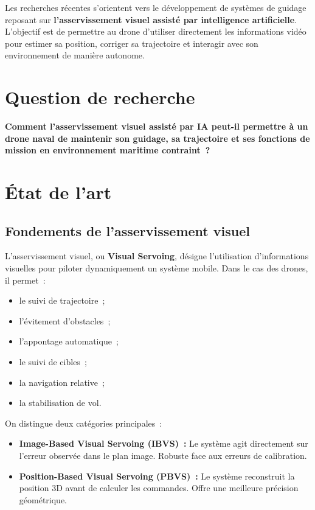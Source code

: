 \documentclass[12pt, a4paper, twoside, openright]{report}
\begin{document}
Les recherches récentes s'orientent vers le développement de systèmes de guidage reposant sur \textbf{l'asservissement visuel assisté par intelligence artificielle}. L'objectif est de permettre au drone d'utiliser directement les informations vidéo pour estimer sa position, corriger sa trajectoire et interagir avec son environnement de manière autonome.

\section{Question de recherche}

\begin{mdframed}[backgroundcolor=blue!5, linewidth=1.5pt, linecolor=blue]
\textbf{Comment l'asservissement visuel assisté par IA peut-il permettre à un drone naval de maintenir son guidage, sa trajectoire et ses fonctions de mission en environnement maritime contraint~?}
\end{mdframed}

\section{État de l'art}

\subsection{Fondements de l'asservissement visuel}

L'asservissement visuel, ou \textbf{Visual Servoing}, désigne l'utilisation d'informations visuelles pour piloter dynamiquement un système mobile. Dans le cas des drones, il permet~:

\begin{itemize}
    \item le suivi de trajectoire~;
    \item l'évitement d'obstacles~;
    \item l'appontage automatique~;
    \item le suivi de cibles~;
    \item la navigation relative~;
    \item la stabilisation de vol.
\end{itemize}

On distingue deux catégories principales~:

\begin{itemize}
    \item \textbf{Image-Based Visual Servoing (IBVS)~:} Le système agit directement sur l'erreur observée dans le plan image. Robuste face aux erreurs de calibration.
    \item \textbf{Position-Based Visual Servoing (PBVS)~:} Le système reconstruit la position 3D avant de calculer les commandes. Offre une meilleure précision géométrique.
\end{itemize}
\end{document}
